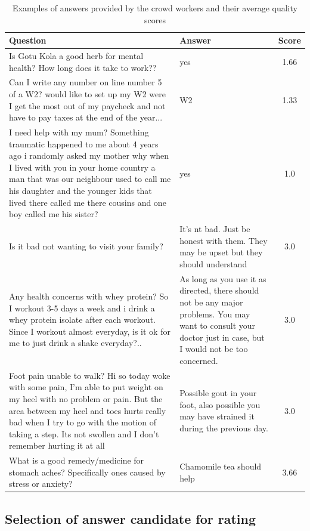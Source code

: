 \documentclass[letterpaper]{article}
\begin{document}
\begin{table}[ht]
\centering
\begin{tabular}{| p{10.5cm} | p{5cm} | c |}
\hline
Question & Answer & Score \\
\hline
 Is Gotu Kola a good herb for mental health? How long does it take to work?? & yes & 1.66\\
 \hline
Can I write any number on line number 5 of a W2?  would like to set up my W2 were I get the most out of my paycheck and not have to pay taxes at the end of the year... & W2 & 1.33\\
 \hline
I need help with my mum? Something traumatic happened to me about 4 years ago i randomly asked my mother why when I lived with you in your home country a man that was our neighbour used to call me his daughter and the younger kids that lived there called me there cousins and one boy called me his sister? & yes & 1.0\\
\hline
\hline
 Is it bad not wanting to visit your family? & It's nt bad. Just be honest with them. They may be upset but they should understand & 3.0 \\
 \hline
Any health concerns with whey protein? So I workout 3-5 days a week and i drink a whey protein isolate after each workout. Since I workout almost everyday, is it ok for me to just drink a shake everyday?.. & As long as you use it as directed, there should not be any major problems.  You may want to consult your doctor just in case, but I would not be too concerned. & 3.0\\
\hline
Foot pain unable to walk? Hi so today woke with some pain, I'm able to put weight on my heel with no problem or pain.  But  the area between my heel and toes hurts really bad when I try to go with the motion of taking a step. Its not swollen and I don't remember hurting it at all & Possible gout in your foot, also possible you may have strained it during the previous day. & 3.0\\
\hline
What is a good remedy/medicine for stomach aches? Specifically ones caused by stress or anxiety? & Chamomile tea should help & 3.66\\
\hline
\end{tabular}
\caption{Examples of answers provided by the crowd workers and their average quality scores}
\label{table:answer_examples}
\end{table}

\subsection{Selection of answer candidate for rating}
\label{sec:analysis:order}
\end{document}
